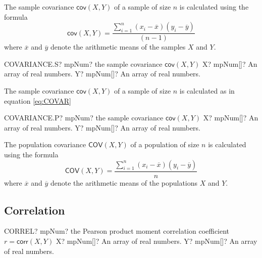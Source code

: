 \vspace{0.3cm}
The sample covariance $\textsf{cov}(X,Y)$ of a sample of size $n$ is calculated using the formula
\begin{equation} \label{eq:COVAR}
	\textsf{cov}(X,Y) = \frac{\sum_{i=1}^n (x_i-\overline{x})(y_i-\overline{y})}{(n-1)} 
\end{equation}
where $\overline{x}$ and $\overline{y}$ denote the arithmetic means of the samples $X$ and $Y$.

\vspace{0.6cm}
\begin{mpFunctionsExtract}
	\mpWorksheetFunctionTwoNotImplemented
	{COVARIANCE.S? mpNum? the sample covariance $\textsf{cov}(X,Y)$}
	{X? mpNum[]? An array of real numbers.}
	{Y? mpNum[]? An array of real numbers.}
\end{mpFunctionsExtract}

\vspace{0.3cm}
The sample covariance $\textsf{cov}(X,Y)$ of a sample of size $n$ is calculated as in equation \ref{eq:COVAR}


\vspace{0.6cm}
\begin{mpFunctionsExtract}
	\mpWorksheetFunctionTwoNotImplemented
	{COVARIANCE.P? mpNum? the sample covariance $\textsf{cov}(X,Y)$}
	{X? mpNum[]? An array of real numbers.}
	{Y? mpNum[]? An array of real numbers.}
\end{mpFunctionsExtract}

\vspace{0.3cm}
The population covariance $\textsf{COV}(X,Y)$ of a population of size $n$ is calculated using the formula
\begin{equation}
	\textsf{COV}(X,Y) = \frac{\sum_{i=1}^n (x_i-\overline{x})(y_i-\overline{y})}{n} 
\end{equation}
where $\overline{x}$ and $\overline{y}$ denote the arithmetic means of the populations $X$ and $Y$.






\subsection{Correlation}
\label{Correlation}

\begin{mpFunctionsExtract}
	\mpWorksheetFunctionTwoNotImplemented
	{CORREL? mpNum? the Pearson product moment correlation coefficient  $r = \textsf{corr}(X,Y)$}
	{X? mpNum[]? An array of real numbers.}
	{Y? mpNum[]? An array of real numbers.}
\end{mpFunctionsExtract}

